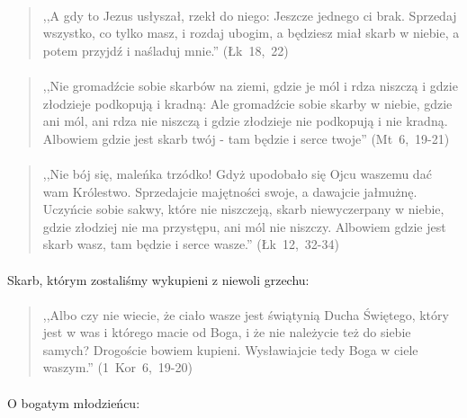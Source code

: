 \documentclass[10pt,a4paper,oneside]{article}
\begin{document}
\paragraph{}
\begin{quote}
,,A gdy to Jezus usłyszał, rzekł do niego: Jeszcze jednego ci brak. Sprzedaj wszystko, co tylko masz, i rozdaj ubogim, a będziesz miał skarb w niebie, a potem przyjdź i naśladuj mnie.'' \mbox{(Łk 18, 22)}
\end{quote}
\paragraph{}
\begin{quote}
,,Nie gromadźcie sobie skarbów na ziemi, gdzie je mól i rdza niszczą i gdzie złodzieje podkopują i kradną: Ale gromadźcie sobie skarby w niebie, gdzie ani mól, ani rdza nie niszczą i gdzie złodzieje nie podkopują i nie kradną. Albowiem gdzie jest skarb twój - tam będzie i serce twoje'' \mbox{(Mt 6, 19-21)}
\end{quote}
\paragraph{}
\begin{quote}
,,Nie bój się, maleńka trzódko! Gdyż upodobało się Ojcu waszemu dać wam Królestwo. Sprzedajcie majętności swoje, a dawajcie jałmużnę. Uczyńcie sobie sakwy, które nie niszczeją, skarb niewyczerpany w niebie, gdzie złodziej nie ma przystępu, ani mól nie niszczy. Albowiem gdzie jest skarb wasz, tam będzie i serce wasze.'' \mbox{(Łk 12, 32-34)}
\end{quote}
\paragraph{}
Skarb, którym zostaliśmy wykupieni z niewoli grzechu:
\paragraph{}
\begin{quote}
,,Albo czy nie wiecie, że ciało wasze jest świątynią Ducha Świętego, który jest w was i którego macie od Boga, i że nie należycie też do siebie samych? Drogoście bowiem kupieni. Wysławiajcie tedy Boga w ciele waszym.'' \mbox{(1 Kor 6, 19-20)}
\end{quote}
\paragraph{}
O bogatym młodzieńcu:
\end{document}
